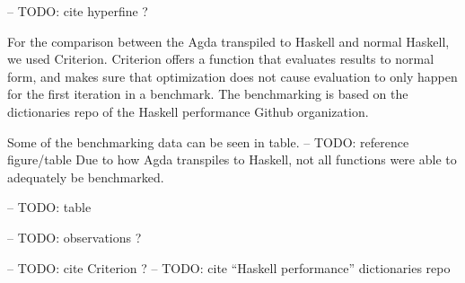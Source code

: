-- TODO: cite hyperfine ?

For the comparison between the Agda transpiled to Haskell and normal Haskell, we used Criterion.
Criterion offers a function that evaluates results to normal form, and makes sure that optimization does not cause evaluation to only happen for the first iteration in a benchmark.
The benchmarking is based on the dictionaries repo of the Haskell performance Github organization.

Some of the benchmarking data can be seen in table. -- TODO: reference figure/table
Due to how Agda transpiles to Haskell, not all functions were able to adequately be benchmarked.

-- TODO: table

-- TODO: observations ?

-- TODO: cite Criterion ?
-- TODO: cite ``Haskell performance'' dictionaries repo